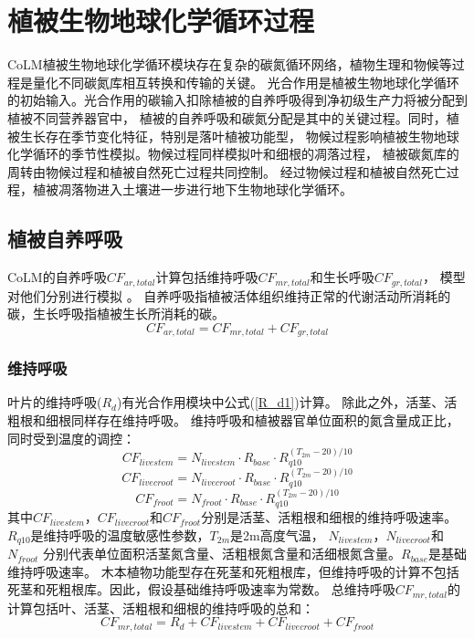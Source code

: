 \chapter{植被生物地球化学循环过程}\label{植被生物地球化学循环过程}

CoLM植被生物地球化学循环模块存在复杂的碳氮循环网络，植物生理和物候等过程是量化不同碳氮库相互转换和传输的关键。
光合作用是植被生物地球化学循环的初始输入。光合作用的碳输入扣除植被的自养呼吸得到净初级生产力将被分配到植被不同营养器官中，
植被的自养呼吸和碳氮分配是其中的关键过程。同时，植被生长存在季节变化特征，特别是落叶植被功能型，
物候过程影响植被生物地球化学循环的季节性模拟。物候过程同样模拟叶和细根的凋落过程，
植被碳氮库的周转由物候过程和植被自然死亡过程共同控制。
经过物候过程和植被自然死亡过程，植被凋落物进入土壤进一步进行地下生物地球化学循环。
\section{植被自养呼吸}\label{植被自养呼吸}
CoLM的自养呼吸$CF_{ar,total}$计算包括维持呼吸$CF_{mr,total}$和生长呼吸$CF_{gr,total}$，
模型对他们分别进行模拟 \citep{lavigne1997growth,sprugel1995respiration}。
自养呼吸指植被活体组织维持正常的代谢活动所消耗的碳，生长呼吸指植被生长所消耗的碳。
\begin{equation}
CF_{ar,total}=CF_{mr, total}+CF_{gr,total}
\end{equation}
\subsection{维持呼吸}
叶片的维持呼吸($R_d$)有光合作用模块中公式(\ref{R_d1})计算。
除此之外，活茎、活粗根和细根同样存在维持呼吸。
维持呼吸和植被器官单位面积的氮含量成正比，同时受到温度的调控：
\begin{equation}
CF_{{livestem}}=N_{{livestem }} \cdot R_{{base }} \cdot R_{q10}^{\left(T_{2m}-20\right) / 10}
\end{equation}
\begin{equation}
CF_{ {livecroot }}=N_{ {livecroot }} \cdot R_{ {base }} \cdot R_{q10}^{\left(T_{2m}-20\right) / 10}
\end{equation}
\begin{equation}
CF_{ {froot }}=N_{{froot}} \cdot R_{{base}} \cdot R_{q10}^{\left(T_{2m}-20\right) / 10}
\end{equation}
其中$CF_{livestem}$，$CF_{livecroot}$和$CF_{froot}$分别是活茎、活粗根和细根的维持呼吸速率。
$R_{q10}$是维持呼吸的温度敏感性参数，$T_{2m}$是2m高度气温， $N_{livestem}$，$N_{livecroot}$和$N_{froot}$
分别代表单位面积活茎氮含量、活粗根氮含量和活细根氮含量。$R_{base}$是基础维持呼吸速率。
木本植物功能型存在死茎和死粗根库，但维持呼吸的计算不包括死茎和死粗根库。因此，假设基础维持呼吸速率为常数。
总维持呼吸$CF_{mr,total}$的计算包括叶、活茎、活粗根和细根的维持呼吸的总和：
\begin{equation}
CF_{mr,total}=R_{d}+CF_{livestem}+CF_{livecroot}+CF_{froot}
\end{equation}
